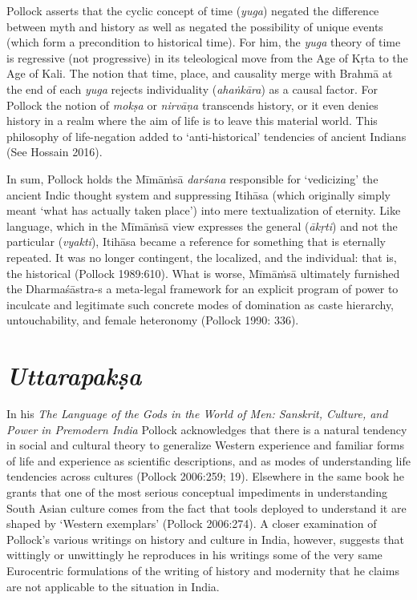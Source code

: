Pollock asserts that the cyclic concept of time (\textit{yuga}) negated the difference between myth and history as well as negated the possibility of unique events (which form a precondition to historical time). For him, the \textit{yuga} theory of time is regressive (not progressive) in its teleological move from the Age of Kṛta to the Age of Kali. The notion that time, place, and causality merge with Brahmā at the end of each \textit{yuga} rejects individuality (\textit{ahaṅkāra}) as a causal factor. For Pollock the notion of \textit{mokṣa} or \textit{nirvāṇa} transcends history, or it even denies history in a realm where the aim of life is to leave this material world. This philosophy of life-negation added to ‘anti-historical’ tendencies of ancient Indians (See Hossain 2016).

In sum, Pollock holds the Mīmāṁsā \textit{darśana} responsible for ‘vedicizing’ the ancient Indic thought system and suppressing Itihāsa (which originally simply meant ‘what has actually taken place’) into mere textualization of eternity. Like language, which in the Mīmāṁsā view expresses the general (\textit{ākṛti}) and not the particular (\textit{vyakti}), Itihāsa became a reference for something that is eternally repeated. It was no longer contingent, the localized, and the individual: that is, the historical (Pollock 1989:610). What is worse, Mīmāṁsā ultimately furnished the Dharmaśāstra-s a meta-legal framework for an explicit program of power to inculcate and legitimate such concrete modes of domination as caste hierarchy, untouchability, and female heteronomy (Pollock 1990: 336).


\section*{\textit{Uttarapakṣa}}

In his \textit{The Language of the Gods in the World of Men: Sanskrit, Culture, and Power in Premodern India} Pollock acknowledges that there is a natural tendency in social and cultural theory to generalize Western experience and familiar forms of life and experience as scientific descriptions, and as modes of understanding life tendencies across cultures (Pollock 2006:259; 19). Elsewhere in the same book he grants that one of the most serious conceptual impediments in understanding South Asian culture comes from the fact that tools deployed to understand it are shaped by ‘Western exemplars’ (Pollock 2006:274). A closer examination of Pollock’s various writings on history and culture in India, however, suggests that wittingly or unwittingly he reproduces in his writings some of the very same Eurocentric formulations of the writing of history and modernity that he claims are not applicable to the situation in India.

